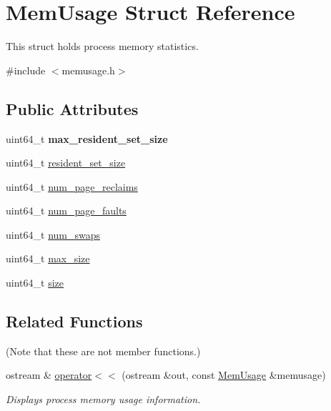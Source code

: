 \hypertarget{structMemUsage}{\section{Mem\+Usage Struct Reference}
\label{structMemUsage}
}


This struct holds process memory statistics.  




{\ttfamily \#include $<$memusage.\+h$>$}

\subsection*{Public Attributes}
\begin{DoxyCompactItemize}
\item 
\hypertarget{structMemUsage_a34942f89004c17e22df12fc440986115}{uint64\+\_\+t {\bfseries max\+\_\+resident\+\_\+set\+\_\+size}}\label{structMemUsage_a34942f89004c17e22df12fc440986115}

\item 
uint64\+\_\+t \hyperlink{structMemUsage_aee7c0f91294b9ec344191ca5085110f3}{resident\+\_\+set\+\_\+size}
\item 
uint64\+\_\+t \hyperlink{structMemUsage_ace61fbe86233e13fb504a2b3733a26a4}{num\+\_\+page\+\_\+reclaims}
\item 
uint64\+\_\+t \hyperlink{structMemUsage_aea2abd0b56172239f29b73fdd93d11d8}{num\+\_\+page\+\_\+faults}
\item 
uint64\+\_\+t \hyperlink{structMemUsage_aa36d9bec23bcbc858b1d89bfd8aed136}{num\+\_\+swaps}
\item 
uint64\+\_\+t \hyperlink{structMemUsage_a3607fbd80c1b4b7b156aab8fb41605b8}{max\+\_\+size}
\item 
uint64\+\_\+t \hyperlink{structMemUsage_aea96a2509e52b4b27806869d425b6255}{size}
\end{DoxyCompactItemize}
\subsection*{Related Functions}
(Note that these are not member functions.) \begin{DoxyCompactItemize}
\item 
ostream \& \hyperlink{structMemUsage_a05793fb5553dfe8e8dee5df2247da1ac}{operator$<$$<$} (ostream \&out, const \hyperlink{structMemUsage}{Mem\+Usage} \&memusage)
\begin{DoxyCompactList}\small\item\em Displays process memory usage information. \end{DoxyCompactList}\end{DoxyCompactItemize}


